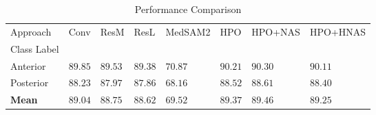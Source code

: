\begin{table}
\caption{Performance Comparison}
\label{tab:results}
\begin{tabular}{llllllll}
\toprule
Approach & Conv & ResM & ResL & MedSAM2 & HPO & HPO+NAS & HPO+HNAS \\
Class Label &  &  &  &  &  &  &  \\
\midrule
Anterior & $89.85$ & $89.53$ & $89.38$ & $70.87$ & $90.21$ & $\mathbf{90.30}$ & $90.11$ \\
Posterior & $88.23$ & $87.97$ & $87.86$ & $68.16$ & $88.52$ & $\mathbf{88.61}$ & $88.40$ \\
\textbf{Mean} & $89.04$ & $88.75$ & $88.62$ & $69.52$ & $89.37$ & $\mathbf{89.46}$ & $89.25$ \\
\bottomrule
\end{tabular}
\end{table}
